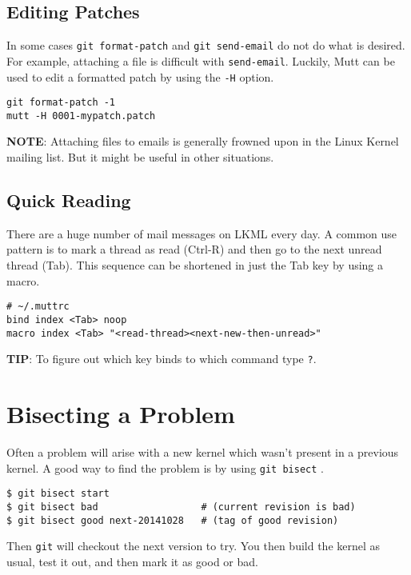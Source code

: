 \documentclass{article}
\begin{document}
\subsection{Editing Patches}

In some cases \verb+git format-patch+ and \verb+git send-email+ do not do what is
desired.  For example, attaching a file is difficult with \verb+send-email+.
Luckily, Mutt can be used to edit a formatted patch by using the \verb+-H+
option.

\begin{verbatim}
git format-patch -1
mutt -H 0001-mypatch.patch
\end{verbatim}

\textbf{NOTE}: Attaching files to emails is generally frowned upon in the
Linux Kernel mailing list. But it might be useful in other situations.

\subsection{Quick Reading}

There are a huge number of mail messages on LKML every day.  A common
use pattern is to mark a thread as read (Ctrl-R) and then go to the next
unread thread (Tab).  This sequence can be shortened in just the Tab key
by using a macro.

\begin{verbatim}
# ~/.muttrc
bind index <Tab> noop
macro index <Tab> "<read-thread><next-new-then-unread>"
\end{verbatim}

\textbf{TIP}: To figure out which key binds to which command type \verb+?+.

\section{Bisecting a Problem}

Often a problem will arise with a new kernel which wasn't present in a
previous kernel.  A good way to find the problem is by using
\verb+git bisect+ \autocite{debug-with-git}.

\begin{verbatim}
$ git bisect start
$ git bisect bad                  # (current revision is bad)
$ git bisect good next-20141028   # (tag of good revision)
\end{verbatim}

Then \verb+git+ will checkout the next version to try.  You then build the
kernel as usual, test it out, and then mark it as good or bad.
\end{document}
